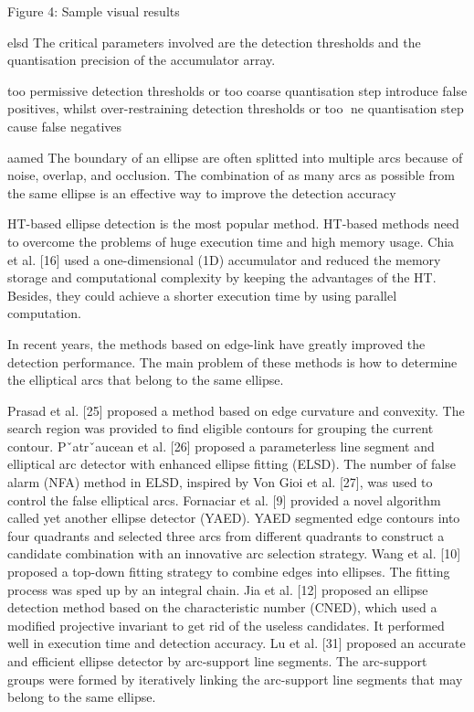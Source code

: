 \documentclass[a4paper]{report}
\begin{document}
Figure 4: Sample visual results


elsd
The critical parameters involved are the detection thresholds and the quantisation precision
of the accumulator array.

too permissive detection thresholds
or too coarse quantisation step introduce false positives, whilst over-restraining
detection thresholds or too ne quantisation step cause false negatives

aamed
The boundary of an ellipse are often splitted
into multiple arcs because of noise, overlap, and occlusion.
The combination of as many arcs as possible from the same
ellipse is an effective way to improve the detection accuracy

HT-based ellipse detection is the most popular method.
HT-based methods need to overcome the problems of huge
execution time and high memory usage.
Chia et al. [16]
used a one-dimensional (1D) accumulator and reduced the
memory storage and computational complexity by keeping
the advantages of the HT. Besides, they could achieve a
shorter execution time by using parallel computation.

In recent years, the methods based on edge-link have greatly
improved the detection performance. The main problem of
these methods is how to determine the elliptical arcs that
belong to the same ellipse.

Prasad et al. [25] proposed a method
based on edge curvature and convexity. The search region was
provided to find eligible contours for grouping the current
contour. Pˇatrˇaucean et al. [26] proposed a parameterless line
segment and elliptical arc detector with enhanced ellipse fitting
(ELSD). The number of false alarm (NFA) method in ELSD,
inspired by Von Gioi et al. [27], was used to control the false
elliptical arcs. Fornaciar et al. [9] provided a novel algorithm
called yet another ellipse detector (YAED). YAED segmented
edge contours into four quadrants and selected three arcs
from different quadrants to construct a candidate combination
with an innovative arc selection strategy. Wang et al. [10]
proposed a top-down fitting strategy to combine edges into
ellipses. The fitting process was sped up by an integral
chain. Jia et al. [12] proposed an ellipse
detection method based on the characteristic number (CNED),
which used a modified projective invariant to get rid of the
useless candidates. It performed well in execution time and
detection accuracy. Lu et al. [31] proposed an accurate and efficient ellipse detector
by arc-support line segments. The arc-support groups were
formed by iteratively linking the arc-support line segments that
may belong to the same ellipse. 
\end{document}
